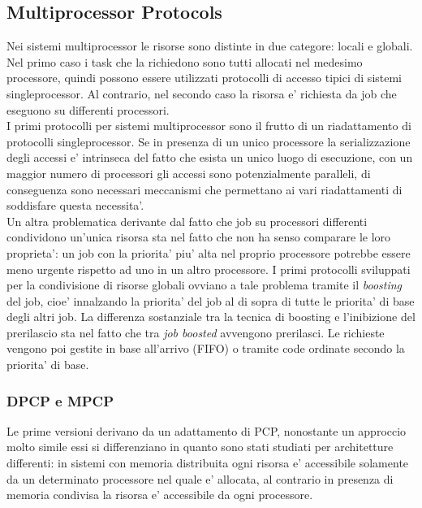 \subsection{Multiprocessor Protocols}
\label{sec:lockProtocols.multi}

Nei sistemi multiprocessor le risorse sono distinte in due categore: locali e globali. Nel primo caso i task che la richiedono sono tutti allocati nel medesimo processore, quindi possono essere utilizzati protocolli di accesso tipici di sistemi singleprocessor. Al contrario, nel secondo caso la risorsa e' richiesta da job che eseguono su differenti processori.\\

I primi protocolli per sistemi multiprocessor sono il frutto di un riadattamento di protocolli singleprocessor. Se in presenza di un unico processore la serializzazione degli accessi e' intrinseca del fatto che esista un unico luogo di esecuzione, con un maggior numero di processori gli accessi sono potenzialmente paralleli, di conseguenza sono necessari meccanismi che permettano ai vari riadattamenti di soddisfare questa necessita'.\\

Un altra problematica derivante dal fatto che job su processori differenti condividono un'unica risorsa sta nel fatto che non ha senso comparare le loro proprieta': un job con la priorita' piu' alta nel proprio processore potrebbe essere meno urgente rispetto ad uno in un altro processore. I primi protocolli sviluppati per la condivisione di risorse globali ovviano a tale problema tramite il \textit{boosting} del job, cioe' innalzando la priorita' del job al di sopra di tutte le priorita' di base degli altri job. La differenza sostanziale tra la tecnica di boosting e l'inibizione del prerilascio sta nel fatto che tra \textit{job boosted} avvengono prerilasci. Le richieste vengono poi gestite in base all'arrivo (FIFO) o tramite code ordinate secondo la priorita' di base.

\subsubsection{DPCP e MPCP}
\label{sec:lockProtocols.dpcp.mpcp}

Le prime versioni derivano da un adattamento di PCP, nonostante un approccio molto simile essi si differenziano in quanto sono stati studiati per architetture differenti: in sistemi con memoria distribuita ogni risorsa e' accessibile solamente da un determinato processore nel quale e' allocata, al contrario in presenza di memoria condivisa la risorsa e' accessibile da ogni processore.\\

